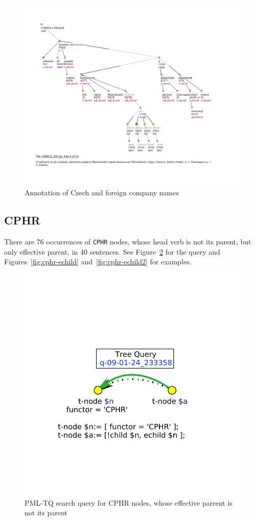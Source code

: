 \documentclass[11pt, a4paper]{article}
\begin{document}
\begin{figure}
\includegraphics[width=\textwidth]{images/vyhledavky/nazvy-firem.pdf}
\caption{Annotation of Czech and foreign company names}
\label{fig:forn-firmy}
\end{figure}

\subsection{CPHR}
There are 76 occurrences of {\tt CPHR} nodes, whose head verb is not its parent, but only effective parent, in 40 sentences. See Figure~\ref{fig:tq-echild} for the query and Figures~\ref{fig:cphr-echild} and~\ref{fig:cphr-echild2} for examples.
\begin{figure}
\includegraphics[width=0.3 \textwidth]{images/vyhledavky/query-echild.pdf}
\caption{PML-TQ search query for CPHR nodes, whose effective parrent is not its parent}
\label{fig:tq-echild}
\end{figure}
\end{document}
